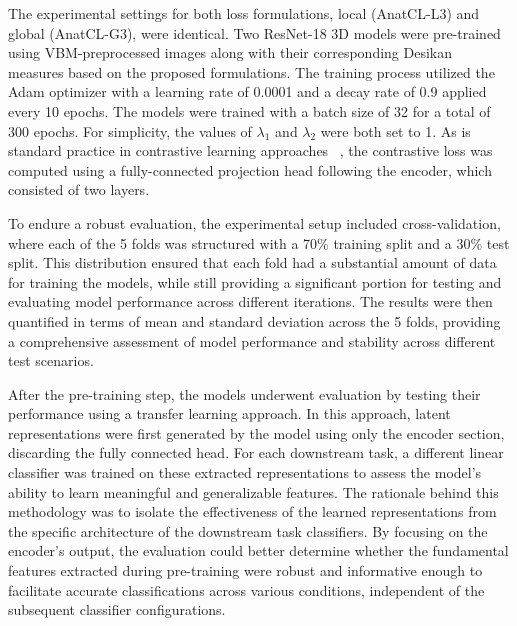 The experimental settings for both loss formulations, local (AnatCL-L3) and
global (AnatCL-G3), were identical. Two ResNet-18 3D models were pre-trained
using VBM-preprocessed images along with their corresponding Desikan measures
based on the proposed formulations. The training process utilized the Adam
optimizer with a learning rate of 0.0001 and a decay rate of 0.9 applied every
10 epochs. The models were trained with a batch size of 32 for a total of 300
epochs. For simplicity, the values of $\lambda_1$ and $\lambda_2$ were both set
to 1. As is standard practice in contrastive learning approaches
~\cite{chen_self_contrastive_2020, khosla_supervised_contrastive_2021}, the
contrastive loss was computed using a fully-connected projection head following
the encoder, which consisted of two layers.

To endure a robust evaluation, the experimental setup included cross-validation,
where each of the 5 folds was structured with a 70\% training split and a 30\%
test split. This distribution ensured that each fold had a substantial amount of
data for training the models, while still providing a significant portion for
testing and evaluating model performance across different iterations. The
results were then quantified in terms of mean and standard deviation across the
5 folds, providing a comprehensive assessment of model performance and stability
across different test scenarios.

After the pre-training step, the models underwent evaluation by testing their
performance using a transfer learning approach. In this approach, latent
representations were first generated by the model using only the encoder
section, discarding the fully connected head. For each
downstream task, a different linear classifier was trained on these extracted
representations to assess the model's ability to learn meaningful and
generalizable features. The rationale behind this methodology was to isolate the
effectiveness of the learned representations from the specific architecture of
the downstream task classifiers. By focusing on the encoder's output, the
evaluation could better determine whether the fundamental features extracted
during pre-training were robust and informative enough to facilitate accurate
classifications across various conditions, independent of the subsequent
classifier configurations.

